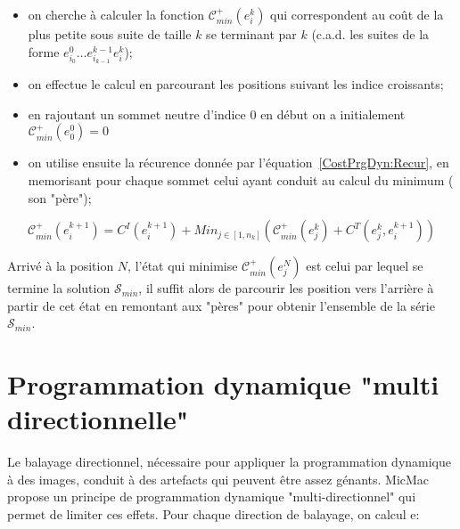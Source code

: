 {\begin{itemize}

\label{Def:CPlusMin}
   \item on cherche \`a calculer la fonction $ \mathcal C^+_{min} (e^k_i)$
   qui correspondent au co\^ut de la plus petite sous suite de
   taille $k$ se  terminant par $k$ (c.a.d.  les suites 
   de la forme $e^0_{i_0} \dots e^{k-1}_{i_{k-1}} e^k_i$);
   
   \item on effectue le calcul en parcourant les positions 
         suivant les indice croissants;

   \item  en rajoutant un sommet neutre d'indice $0$ en d\'ebut on a
          initialement  $ \mathcal C^+_{min} (e^0_0) = 0$

   \item on utilise ensuite la r\'ecurence donn\'ee par
         l'\'equation~\ref{CostPrgDyn:Recur}, en memorisant
	 pour chaque sommet celui ayant conduit au calcul
	 du minimum ( son "p\`ere");
         
\end{itemize}

\begin{equation}
\label{CostPrgDyn:Recur}
 \mathcal C^+_{min} (e^{k+1}_i) =  C^I(e^{k+1}_i)+Min_{j\in[1,n_k]}(
             \mathcal  C^+_{min} (e^k_j) +  C^T(e^k_j,e^{k+1}_i)
 )
\end{equation}

Arriv\'e  \`a la position $N$, l'\'etat qui minimise $\mathcal  C^+_{min} (e^N_j) $
est celui par lequel se termine  la solution $\mathcal S_{min} $, il
suffit alors de parcourir les position vers l'arri\`ere \`a partir de cet
\'etat en remontant aux "p\`eres" pour obtenir l'ensemble de  la
s\'erie $\mathcal S_{min} $.



\section{Programmation dynamique "multi directionnelle"}

\label{ProgDyn:MulDir}

Le balayage directionnel, n\'ecessaire pour appliquer la 
programmation dynamique \`a des images, conduit \`a des
artefacts qui peuvent \^etre assez g\'enants.
MicMac propose un principe de programmation dynamique "multi-directionnel"
qui permet de limiter ces effets.
Pour chaque direction de balayage, on
calcul e:

}
